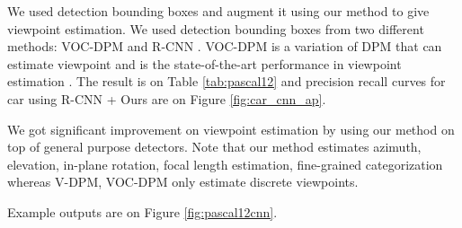 \documentclass[10pt,twocolumn,letterpaper]{article}
\begin{document}
We used detection bounding boxes and augment it using our method to give viewpoint estimation. We used detection bounding boxes from two different methods: VOC-DPM \cite{Pepik12} and R-CNN \cite{Girshick14}. VOC-DPM is a variation of DPM that can estimate viewpoint and is the state-of-the-art performance in viewpoint estimation \cite{Xiang14}. The result is on Table \ref{tab:pascal12} and precision recall curves for car using R-CNN + Ours are on Figure \ref{fig:car_cnn_ap}. 

We got significant improvement on viewpoint estimation by using our method on top of general purpose detectors. Note that our method estimates azimuth, elevation, in-plane rotation, focal length estimation, fine-grained categorization whereas V-DPM, VOC-DPM only estimate discrete viewpoints.

Example outputs are on Figure \ref{fig:pascal12cnn}.
\end{document}
